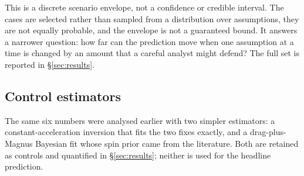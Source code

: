 This is a discrete scenario envelope, not a confidence or credible interval. The
cases are selected rather than sampled from a distribution over assumptions,
they are not equally probable, and the envelope is not a guaranteed bound. It
answers a narrower question: how far can the prediction move when one assumption
at a time is changed by an amount that a careful analyst might defend? The full
set is reported in \S\ref{sec:results}.

\subsection{Control estimators}

The same six numbers were analysed earlier with two simpler estimators: a
constant-acceleration inversion that fits the two fixes exactly, and a
drag-plus-Magnus Bayesian fit whose spin prior came from the literature. Both
are retained as controls and quantified in \S\ref{sec:results}; neither is used
for the headline prediction.
